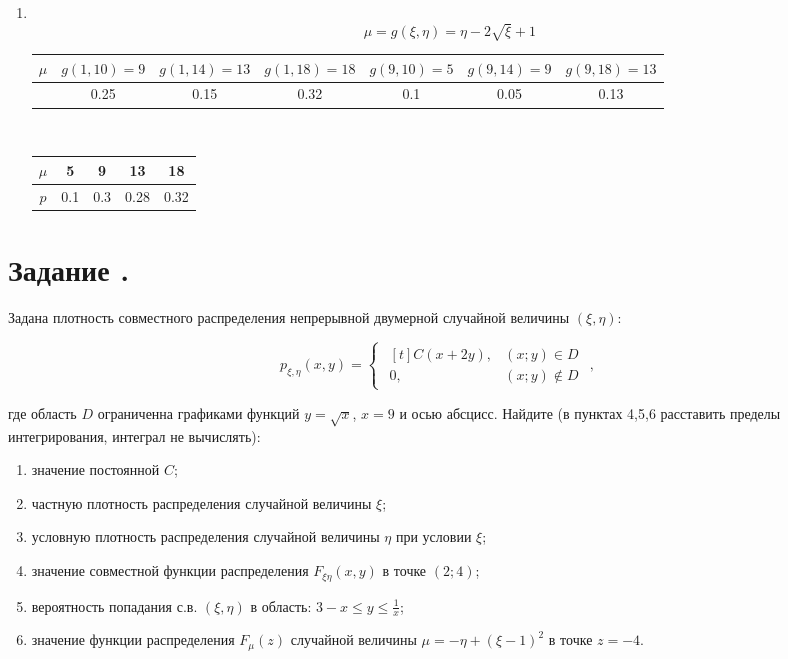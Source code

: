 \documentclass[12pt]{article}
\begin{document}
\begin{enumerate}
	\item \mbox{}\\
	      \[\mu = g(\xi, \eta) = \eta - 2 \sqrt{\xi} + 1\]
	      \begin{tabular}{|c|c|c|c|c|c|c|}
		      \hline
		      $\mu$ & $g(1, 10) = 9$ & $g(1, 14) = 13$ & $g(1, 18) = 18$
		            & $g(9, 10) = 5$ & $g(9, 14) = 9$  & $g(9, 18) = 13$ \\
		      \hline
		            & 0.25           & 0.15            & 0.32
		            & 0.1            & 0.05            & 0.13            \\
		      \hline
	      \end{tabular} \\
	      \begin{tabular}{|c|c|c|c|c|}
		      \hline
		      $\mu$ & 5   & 9   & 13   & 18   \\
		      \hline
		      $p$   & 0.1 & 0.3 & 0.28 & 0.32 \\
		      \hline
	      \end{tabular}
\end{enumerate}

\section*{Задание .}

Задана плотность совместного распределения непрерывной двумерной случайной величины $(\xi,\eta)$:

\begin{equation*}
	p_{\xi,\eta}(x,y) =
	\begin{cases}
		\begin{aligned}[t]
			C(x + 2y), & (x;y) \in D    \\
			0,         & (x;y) \notin D
		\end{aligned}
	\end{cases},
\end{equation*}

где область $D$ ограниченна графиками функций $y = \sqrt{x}$, $x = 9$ и осью абсцисс.
Найдите (в пунктах 4,5,6 расставить пределы интегрирования, интеграл не вычислять):

\begin{enumerate}
	\item значение постоянной $C$;
	\item частную плотность распределения случайной величины $\xi$;
	\item условную плотность распределения случайной величины $\eta$ при условии $\xi$;
	\item значение совместной функции распределения $F_{\xi\eta}(x,y)$ в точке $(2; 4)$;
	\item вероятность попадания с.в. $(\xi, \eta)$ в область: $3 - x \leq y \leq \frac{1}{x}$;
	\item значение функции распределения $F_{\mu}(z)$
	      случайной величины $\mu = -\eta + (\xi - 1)^2$ в точке $z = −4$.
\end{enumerate}
\end{document}

